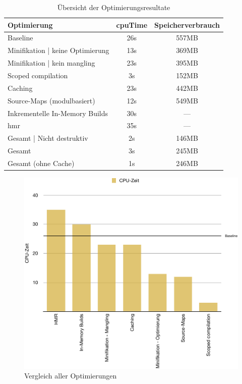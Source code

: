 \documentclass[11pt]{report}
\begin{document}
		\begin{table}[h]
			\centering
            \bgroup
            \def\arraystretch{1.5}
			\begin{tabular}{ l | c | c }
				Optimierung & \Gls{cpuTime} & Speicherverbrauch \\
				\hline
				\hline
				Baseline & 26s & 557MB \\
				\hdashline
				Minifikation | keine Optimierung & 13s & 369MB \\
				Minifikation | kein \Gls{mangling} & 23s & 395MB \\
				Scoped compilation & 3s & 152MB \\
				\hdashline
				Caching & 23s & 442MB \\
				Source-Maps (modulbasiert) & 12s & 549MB \\
				Inkrementelle In-Memory Builds & 30s & --- \\
				\Gls{hmr} & 35s & --- \\
				\hline
				Gesamt | Nicht destruktiv & 2s & 146MB \\
				Gesamt & 3s & 245MB \\
				Gesamt (ohne Cache) & 1s & 246MB \\
			\end{tabular}
			\egroup
            \caption{Übersicht der Optimierungsresultate}
            \label{table:optimizationResultOverview}
		\end{table}
		
		\begin{figure}[h]
			\includegraphics[width=\textwidth]{img/resultGraph}
            \caption{Vergleich aller Optimierungen}
            \label{figure:resultGraph}
		\end{figure}
\end{document}
